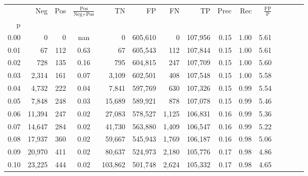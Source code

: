 \begin{tabular}{rrrcrrrrrrrrrrr}
\toprule
{} &     Neg &    Pos & $\frac{\text{Pos}}{\text{Neg}+\text{Pos}}$ &       TN &       FP &       FN &       TP &  Prec &   Rec & $\frac{\text{FP}}{\text{P}}$ \\
p    &         &        &                                            &          &          &          &          &       &       &                              \\
\midrule
0.00 &       0 &      0 &                                        nan &        0 &  605,610 &        0 &  107,956 &  0.15 &  1.00 &                         5.61 \\
0.01 &      67 &    112 &                                       0.63 &       67 &  605,543 &      112 &  107,844 &  0.15 &  1.00 &                         5.61 \\
0.02 &     728 &    135 &                                       0.16 &      795 &  604,815 &      247 &  107,709 &  0.15 &  1.00 &                         5.60 \\
0.03 &   2,314 &    161 &                                       0.07 &    3,109 &  602,501 &      408 &  107,548 &  0.15 &  1.00 &                         5.58 \\
0.04 &   4,732 &    222 &                                       0.04 &    7,841 &  597,769 &      630 &  107,326 &  0.15 &  0.99 &                         5.54 \\
0.05 &   7,848 &    248 &                                       0.03 &   15,689 &  589,921 &      878 &  107,078 &  0.15 &  0.99 &                         5.46 \\
0.06 &  11,394 &    247 &                                       0.02 &   27,083 &  578,527 &    1,125 &  106,831 &  0.16 &  0.99 &                         5.36 \\
0.07 &  14,647 &    284 &                                       0.02 &   41,730 &  563,880 &    1,409 &  106,547 &  0.16 &  0.99 &                         5.22 \\
0.08 &  17,937 &    360 &                                       0.02 &   59,667 &  545,943 &    1,769 &  106,187 &  0.16 &  0.98 &                         5.06 \\
0.09 &  20,970 &    411 &                                       0.02 &   80,637 &  524,973 &    2,180 &  105,776 &  0.17 &  0.98 &                         4.86 \\
0.10 &  23,225 &    444 &                                       0.02 &  103,862 &  501,748 &    2,624 &  105,332 &  0.17 &  0.98 &                         4.65 \\

\end{tabular}
